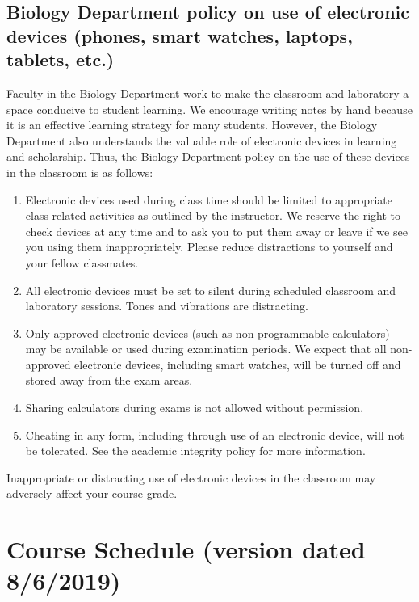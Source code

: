 \documentclass{tufte-handout}
\begin{document}
\begin{fullwidth}

\subsection{Biology Department policy on use of electronic devices (phones, smart watches, laptops, tablets, etc.)}

Faculty in the Biology Department work to make the classroom and laboratory a space conducive to student learning. We encourage writing notes by hand because it is an effective learning strategy for many students. However, the Biology Department also understands the valuable role of electronic devices in learning and scholarship. Thus, the Biology Department policy on the use of these devices in the classroom is as follows:


\begin{enumerate}
\item Electronic devices used during class time should be limited to appropriate class-related activities as outlined by the instructor. We reserve the right to check devices at any time and to ask you to put them away or leave if we see you using them inappropriately. Please reduce distractions to yourself and your fellow classmates.
\item All electronic devices must be set to silent during scheduled classroom and laboratory sessions. Tones and vibrations are distracting.
\item Only approved electronic devices (such as non-programmable calculators) may be available or used during examination periods. We expect that all non-approved electronic devices, including smart watches, will be turned off and stored away from the exam areas.
\item Sharing calculators during exams is not allowed without permission. 
\item Cheating in any form, including through use of an electronic device, will not be tolerated. See the academic integrity policy for more information.
\end{enumerate}

Inappropriate or distracting use of electronic devices in the classroom may adversely affect your course grade. 





\newpage

\section{Course Schedule (version dated 8/6/2019)}


\end{fullwidth}
\end{document}
